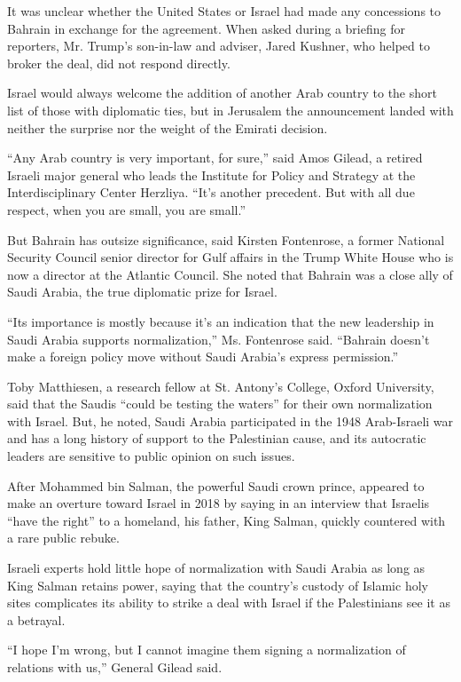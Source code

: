 It was unclear whether the United States or Israel had made any
concessions to Bahrain in exchange for the agreement. When asked during
a briefing for reporters, Mr. Trump's son-in-law and adviser, Jared
Kushner, who helped to broker the deal, did not respond directly.

Israel would always welcome the addition of another Arab country to the
short list of those with diplomatic ties, but in Jerusalem the
announcement landed with neither the surprise nor the weight of the
Emirati decision.

``Any Arab country is very important, for sure,'' said Amos Gilead, a
retired Israeli major general who leads the Institute for Policy and
Strategy at the Interdisciplinary Center Herzliya. ``It's another
precedent. But with all due respect, when you are small, you are
small.''

But Bahrain has outsize significance, said Kirsten Fontenrose, a former
National Security Council senior director for Gulf affairs in the Trump
White House who is now a director at the Atlantic Council. She noted
that Bahrain was a close ally of Saudi Arabia, the true diplomatic prize
for Israel.

``Its importance is mostly because it's an indication that the new
leadership in Saudi Arabia supports normalization,'' Ms. Fontenrose
said. ``Bahrain doesn't make a foreign policy move without Saudi
Arabia's express permission.''

Toby Matthiesen, a research fellow at St. Antony's College, Oxford
University, said that the Saudis ``could be testing the waters'' for
their own normalization with Israel. But, he noted, Saudi Arabia
participated in the 1948 Arab-Israeli war and has a long history of
support to the Palestinian cause, and its autocratic leaders are
sensitive to public opinion on such issues.

After Mohammed bin Salman, the powerful Saudi crown prince, appeared to
make an overture toward Israel in 2018 by saying in an interview that
Israelis ``have the right'' to a homeland, his father, King Salman,
quickly countered with a rare public rebuke.

Israeli experts hold little hope of normalization with Saudi Arabia as
long as King Salman retains power, saying that the country's custody of
Islamic holy sites complicates its ability to strike a deal with Israel
if the Palestinians see it as a betrayal.

``I hope I'm wrong, but I cannot imagine them signing a normalization of
relations with us,'' General Gilead said.


